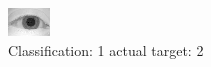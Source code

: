 \begin{figure}[h!]
\begin{center}
\includegraphics[width=0.60\columnwidth]{figures/ID978_class_1_target_2.png}
\end{center}
\caption{ Classification: 1 actual target: 2}
\label{fig:ID978_class_1_target_2}
\end{figure}

